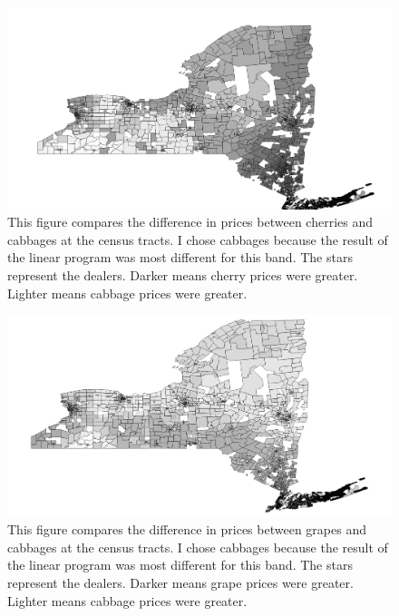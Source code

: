\documentclass{report}
\begin{document}
\begin{figure}
\centering
\begin{framed}
\includegraphics[scale=.50]{stores_243_66}
\caption{This figure compares the difference in prices between cherries and cabbages at the census tracts. I chose cabbages because the result of the linear program was most different for this band. The stars represent the dealers. Darker means cherry prices were greater. Lighter means cabbage prices were greater.}
\label{fig:stores_243_66}
\end{framed}
\end{figure}

\begin{figure}
\centering
\begin{framed}
\includegraphics[scale=.50]{stores_243_69}
\caption{This figure compares the difference in prices between grapes and cabbages at the census tracts. I chose cabbages because the result of the linear program was most different for this band. The stars represent the dealers. Darker means grape prices were greater. Lighter means cabbage prices were greater.}
\label{fig:stores_243_69}
\end{framed}
\end{figure}
\end{document}
